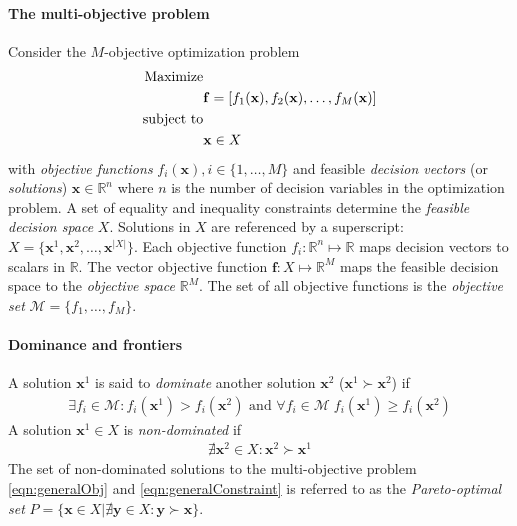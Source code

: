 \paragraph{The multi-objective problem}
Consider the $M$-objective optimization problem
\begin{align}
\text{Maximize}& \notag \\
& \mathbf{f} = [f_1(\mathbf{x}), f_2(\mathbf{x}), \ldots, f_M(\mathbf{x}) ] \label{eqn:generalObj}\\
\text{subject to}& \notag \\
& \mathbf{x} \in X \label{eqn:generalConstraint}
\end{align}
with \textit{objective functions} $f_i(\mathbf{x}), i \in \{1,\ldots,M\}$ and feasible \textit{decision vectors} (or \textit{solutions}) $\mathbf{x} \in \mathbb{R}^n$ where $n$ is the number of decision variables in the optimization problem. A set of equality and inequality constraints determine the \textit{feasible decision space} $X$. Solutions in $X$ are referenced by a superscript: $X = \{\mathbf{x}^1,\mathbf{x}^2,\ldots,\mathbf{x}^{|X|}\}$. Each objective function $f_i : \mathbb{R}^n \mapsto \mathbb{R}$ maps decision vectors to scalars in $\mathbb{R}$. The vector objective function $\mathbf{f} : X \mapsto \mathbb{R}^M$ maps the feasible decision space to the \textit{objective space} $\mathbb{R}^M$. The set of all objective functions is the \textit{objective set} $\mathcal{M} = \{f_1,\ldots,f_M\}$.

\paragraph{Dominance and frontiers}
A solution $\mathbf{x}^1$ is said to \textit{dominate} another solution $\mathbf{x}^2$ ($\mathbf{x}^1 \succ \mathbf{x}^2$) if
\begin{align}
\exists f_i \in \mathcal{M} : f_i(\mathbf{x}^1) > f_i(\mathbf{x}^2) \text{ and } \forall f_i \in \mathcal{M} \; f_i(\mathbf{x}^1) \ge f_i(\mathbf{x}^2)
\end{align}
A solution $\mathbf{x}^1 \in X$ is \textit{non-dominated} if
\begin{align}
\nexists \mathbf{x}^2 \in X : \mathbf{x}^2 \succ \mathbf{x}^1
\end{align}
The set of non-dominated solutions to the multi-objective problem \eqref{eqn:generalObj} and \eqref{eqn:generalConstraint} is referred to as the \textit{Pareto-optimal set} $P = \{\mathbf{x} \in X | \nexists \mathbf{y} \in X : \mathbf{y} \succ \mathbf{x} \}$.

